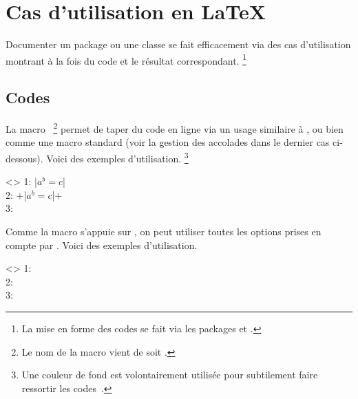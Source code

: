 \documentclass{tutodoc}
\begin{document}
\section{Cas d'utilisation en \LaTeX}
\label{tutodoc-listing-latex}

Documenter un package ou une classe se fait efficacement via des cas d'utilisation montrant à la fois du code et le résultat correspondant.%
\footnote{
    La mise en forme des codes se fait via les packages  et  .
}



\subsection{Codes }
\label{tutodoc-listing-latex-inline}

\begin{tdocexa}
    La macro \,%
    \footnote{
        Le nom de la macro  vient de  soit .
    }
    permet de taper du code en ligne via un usage similaire à , ou bien comme une macro standard (voir la gestion des accolades dans le dernier cas ci-dessous).
    Voici des exemples d'utilisation.%
    \footnote{
    	Une couleur de fond est volontairement utilisée pour subtilement faire ressortir les codes \tdoclatexin{\LaTeX}\,.
    }

    \begin{tdoclatex}<>
1: \tdoclatexin|$a^b = c$|               \\
2: \tdoclatexin+\tdoclatexin|$a^b = c$|+ \\
3: 
	\end{tdoclatex}
\end{tdocexa}


\begin{tdocexa}
    Comme la macro  s'appuie sur , on peut utiliser toutes les options prises en compte par .
    Voici des exemples d'utilisation.

    \begin{tdoclatex}<>
1:              \\
2:  \\
3: 
	\end{tdoclatex}
\end{tdocexa}
\end{document}
